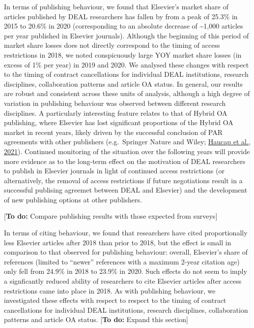 \documentclass[
]{article}
\begin{document}
In terms of publishing behaviour, we found that Elsevier's market share of articles published by DEAL researchers has fallen by from a peak of 25.3\% in 2015 to 20.6\% in 2020 (corresponding to an absolute decrease of \textasciitilde1,000 articles per year published in Elsevier journals). Although the beginning of this period of market share losses does not directly correspond to the timing of access restrictions in 2018, we noted conspicuously large YOY market share losses (in excess of 1\% per year) in 2019 and 2020. We analysed these changes with respect to the timing of contract cancellations for individual DEAL institutions, research disciplines, collaboration patterns and article OA status. In general, our results are robust and consistent across these units of analysis, although a high degree of variation in publishing behaviour was observed between different research disciplines. A particularly interesting feature relates to that of Hybrid OA publishing, where Elsevier has lost significant proportions of the Hybrid OA market in recent years, likely driven by the successful conclusion of PAR agreements with other publishers (e.g.~Springer Nature and Wiley; \href{https://www.dice.hhu.de/fileadmin/redaktion/Fakultaeten/Wirtschaftswissenschaftliche_Fakultaet/DICE/Discussion_Paper/360_Haucap_Moshgbar_Schmal.pdf}{Haucap et al., 2021}). Continued monitoring of the situation over the following years will provide more evidence as to the long-term effect on the motivation of DEAL researchers to publish in Elsevier journals in light of continued access restrictions (or alternatively, the removal of access restrictions if future negotiations result in a successful publising agreemet between DEAL and Elsevier) and the development of new publishing options at other publishers.

{[}\textbf{To do:} Compare publishing results with those expected from surveys{]}

In terms of citing behaviour, we found that researchers have cited proportionally less Elsevier articles after 2018 than prior to 2018, but the effect is small in comparison to that observed for publishing behaviour: overall, Elsevier's share of references (limited to ``newer'' references with a maximum 2-year citation age) only fell from 24.9\% in 2018 to 23.9\% in 2020. Such effects do not seem to imply a signficantly reduced ability of researchers to cite Elsevier articles after access restrictions came into place in 2018. As with publishing behaviour, we investigated these effects with respect to respect to the timing of contract cancellations for individual DEAL institutions, research disciplines, collaboration patterns and article OA status. {[}\textbf{To do:} Expand this section{]}
\end{document}
